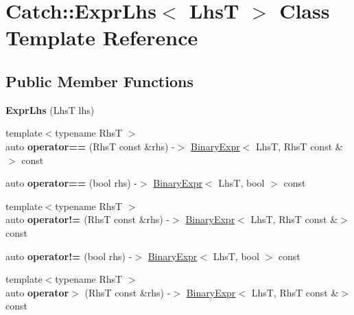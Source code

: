 \hypertarget{class_catch_1_1_expr_lhs}{}\section{Catch\+:\+:Expr\+Lhs$<$ LhsT $>$ Class Template Reference}
\label{class_catch_1_1_expr_lhs}
\subsection*{Public Member Functions}
\begin{DoxyCompactItemize}
\item 
\mbox{\label{class_catch_1_1_expr_lhs_ad22c6af1a7d6993240624d299714a479}} 
{\bfseries Expr\+Lhs} (LhsT lhs)
\item 
\mbox{\label{class_catch_1_1_expr_lhs_a3068adff1dbbaeec62ffc368d4d6cc4d}} 
{\footnotesize template$<$typename RhsT $>$ }\\auto {\bfseries operator==} (RhsT const \&rhs) -\/$>$ \mbox{\hyperlink{class_catch_1_1_binary_expr}{Binary\+Expr}}$<$ LhsT, RhsT const \&$>$ const
\item 
\mbox{\label{class_catch_1_1_expr_lhs_ab707a84abdffbdc35962a495e238d393}} 
auto {\bfseries operator==} (bool rhs) -\/$>$ \mbox{\hyperlink{class_catch_1_1_binary_expr}{Binary\+Expr}}$<$ LhsT, bool $>$ const
\item 
\mbox{\label{class_catch_1_1_expr_lhs_a5e10eab8aed53dd000b89d8fd7754437}} 
{\footnotesize template$<$typename RhsT $>$ }\\auto {\bfseries operator!=} (RhsT const \&rhs) -\/$>$ \mbox{\hyperlink{class_catch_1_1_binary_expr}{Binary\+Expr}}$<$ LhsT, RhsT const \&$>$ const
\item 
\mbox{\label{class_catch_1_1_expr_lhs_a60eca847201d057d8a8b7222c69b619c}} 
auto {\bfseries operator!=} (bool rhs) -\/$>$ \mbox{\hyperlink{class_catch_1_1_binary_expr}{Binary\+Expr}}$<$ LhsT, bool $>$ const
\item 
\mbox{\label{class_catch_1_1_expr_lhs_a23cb0cd983a1ac9c3df5160542199b83}} 
{\footnotesize template$<$typename RhsT $>$ }\\auto {\bfseries operator$>$} (RhsT const \&rhs) -\/$>$ \mbox{\hyperlink{class_catch_1_1_binary_expr}{Binary\+Expr}}$<$ LhsT, RhsT const \&$>$ const

\end{DoxyCompactItemize}
